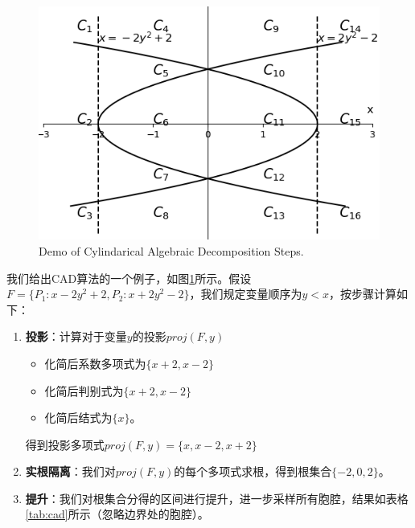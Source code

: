 \begin{example}
\begin{figure}[t]
    \centering
    \includegraphics[width=0.6\columnwidth]{Img/cad.png}
     {Demo of Cylindarical Algebraic Decomposition Steps.}
\label{fig:CAD}
\end{figure}

我们给出CAD算法的一个例子，如图\ref{fig:CAD}所示。假设$F = \{P_1: x - 2y^2 + 2, P_2: x + 2y^2 - 2\}$，我们规定变量顺序为$y < x$，按步骤计算如下：
\begin{enumerate}
    \item \textbf{投影}：计算对于变量$y$的投影$proj(F, y)$
    \begin{itemize}
        \item 化简后系数多项式为$\{x + 2, x - 2\}$
        \item 化简后判别式为$\{x + 2, x - 2\}$
        \item 化简后结式为$\{x\}$。
    \end{itemize}
    得到投影多项式$proj(F, y) = \{x, x - 2, x + 2\}$

    \item \textbf{实根隔离}：我们对$proj(F, y)$的每个多项式求根，得到根集合$\{-2, 0, 2\}$。
    \item \textbf{提升}：我们对根集合分得的区间进行提升，进一步采样所有胞腔，结果如表格\ref{tab:cad}所示（忽略边界处的胞腔）。
    \begin{table}[]
        \tiny
        \centering
\end{table}
\end{enumerate}
\end{example}
